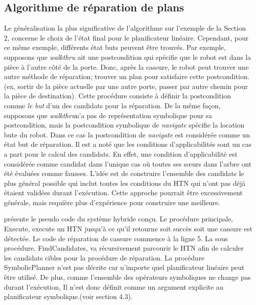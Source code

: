 \documentclass[a4paper,twoside,french]{article}
\begin{document}
			\subsection{Algorithme de réparation de plans}
			\noindent Le généralisation la plus significative de l'algorithme sur l'exemple de la Section 2, concerne le choix de l'état final pour le planificateur linéaire. Cependant, pour ce même exemple, différents état buts peuvent être trouvés.  Par exemple, supposons que {\em walkthru} ait une postcondition qui spécifie que le robot est dans la pièce à l'autre côté de la porte. Donc, après la cassure, le robot peut trouver une autre méthode de réparation; trouver un plan pour satisfaire cette postcondition. (ex, sortir de la pièce actuelle par une autre porte, passer par autre chemin pour la pièce de destination). Cette procédure consiste à définir la postcondition comme {\em le but} d'un  des candidats pour la réparation. De la même façon, supposons que {\em walkthru}n'a pas de représentation symbolique pour sa postcondition, mais la postcondition symbolique de {\em navigate} spécifie la location bute du robot. Dans ce cas la postcondition de {\em navigate} est considérée comme un état but de réparation. Il est a noté que les conditions d'applicabilités sont un cas a part pour le calcul des candidats. En effet, une condition d'applicabilité est considérée comme candidat dans l'unique cas où toutes ses sœurs dans l'arbre ont été évaluées comme fausses.
			L'idée est de construire l'ensemble des candidats le plus général possible qui inclut toutes les conditions du HTN qui n'ont pas déjà étaient validées durant l'exécution. Cette approche pourrait être excessivement générale, mais requière  plus d'expérience pour construire une meilleure. 
			\par {} présente le pseudo code du système hybride conçu. Le procédure principale, {\sc Execute}, execute un HTN jusqu'à ce qu'il retourne soit succès soit une cassure est détectée. Le code de réparation de cassure commence à la ligne 5. La sous procédure, {\sc FindCandidates}, va récursivement parcourir le HTN afin de calculer les candidats cibles pour la procédure de réparation. La procédure {\sc SymbolicPlanner} n'est pas décrite car n'importe quel planificateur linéaire peut être utilisé. De plus, comme l'ensemble des opérateurs symboliques ne change pas durant l'exécution, Il n'est donc définit comme un argument explicite au planificateur symbolique.(voir section 4.3). 
			
\end{document}
